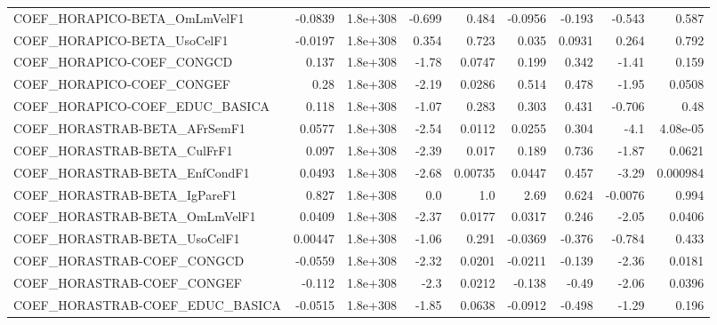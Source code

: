 \begin{tabular}{lrrrrrrrr}
COEF\_HORAPICO-BETA\_OmLmVelF1          &     -0.0839 &     1.8e+308 &  -0.699 &    0.484 &    -0.0956 &      -0.193 &       -0.543 &         0.587 \\
COEF\_HORAPICO-BETA\_UsoCelF1           &     -0.0197 &     1.8e+308 &   0.354 &    0.723 &      0.035 &      0.0931 &        0.264 &         0.792 \\
COEF\_HORAPICO-COEF\_CONGCD             &       0.137 &     1.8e+308 &   -1.78 &   0.0747 &      0.199 &       0.342 &        -1.41 &         0.159 \\
COEF\_HORAPICO-COEF\_CONGEF             &        0.28 &     1.8e+308 &   -2.19 &   0.0286 &      0.514 &       0.478 &        -1.95 &        0.0508 \\
COEF\_HORAPICO-COEF\_EDUC\_BASICA        &       0.118 &     1.8e+308 &   -1.07 &    0.283 &      0.303 &       0.431 &       -0.706 &          0.48 \\
COEF\_HORASTRAB-BETA\_AFrSemF1          &      0.0577 &     1.8e+308 &   -2.54 &   0.0112 &     0.0255 &       0.304 &         -4.1 &      4.08e-05 \\
COEF\_HORASTRAB-BETA\_CulFrF1           &       0.097 &     1.8e+308 &   -2.39 &    0.017 &      0.189 &       0.736 &        -1.87 &        0.0621 \\
COEF\_HORASTRAB-BETA\_EnfCondF1         &      0.0493 &     1.8e+308 &   -2.68 &  0.00735 &     0.0447 &       0.457 &        -3.29 &      0.000984 \\
COEF\_HORASTRAB-BETA\_IgPareF1          &       0.827 &     1.8e+308 &     0.0 &      1.0 &       2.69 &       0.624 &      -0.0076 &         0.994 \\
COEF\_HORASTRAB-BETA\_OmLmVelF1         &      0.0409 &     1.8e+308 &   -2.37 &   0.0177 &     0.0317 &       0.246 &        -2.05 &        0.0406 \\
COEF\_HORASTRAB-BETA\_UsoCelF1          &     0.00447 &     1.8e+308 &   -1.06 &    0.291 &    -0.0369 &      -0.376 &       -0.784 &         0.433 \\
COEF\_HORASTRAB-COEF\_CONGCD            &     -0.0559 &     1.8e+308 &   -2.32 &   0.0201 &    -0.0211 &      -0.139 &        -2.36 &        0.0181 \\
COEF\_HORASTRAB-COEF\_CONGEF            &      -0.112 &     1.8e+308 &    -2.3 &   0.0212 &     -0.138 &       -0.49 &        -2.06 &        0.0396 \\
COEF\_HORASTRAB-COEF\_EDUC\_BASICA       &     -0.0515 &     1.8e+308 &   -1.85 &   0.0638 &    -0.0912 &      -0.498 &        -1.29 &         0.196 \\

\end{tabular}
